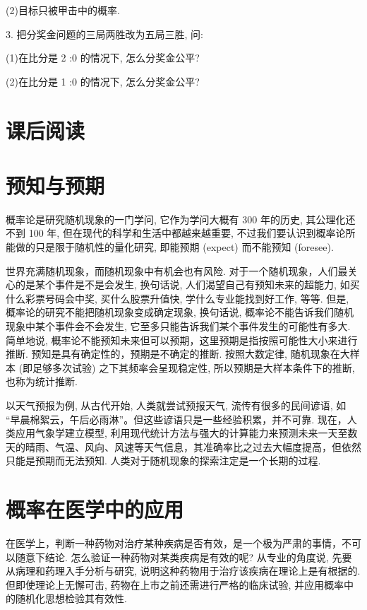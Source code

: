 \documentclass[10pt]{article}
\begin{document}
(2)目标只被甲击中的概率.

3. 把分奖金问题的三局两胜改为五局三胜, 问:

(1)在比分是 2 :0 的情况下, 怎么分奖金公平?

(2)在比分是 1 :0 的情况下, 怎么分奖金公平?

\section*{课后阅读}

\section*{预知与预期}

概率论是研究随机现象的一门学问, 它作为学问大概有 300 年的历史, 其公理化还不到 100 年, 但在现代的科学和生活中都越来越重要, 不过我们要认识到概率论所能做的只是限于随机性的量化研究, 即能预期 (expect) 而不能预知 (foresee).

世界充满随机现象，而随机现象中有机会也有风险. 对于一个随机现象，人们最关心的是某个事件是不是会发生, 换句话说, 人们渴望自己有预知未来的超能力, 如买什么彩票号码会中奖, 买什么股票升值快, 学什么专业能找到好工作, 等等. 但是, 概率论的研究不能把随机现象变成确定现象, 换句话说, 概率论不能告诉我们随机现象中某个事件会不会发生, 它至多只能告诉我们某个事件发生的可能性有多大. 简单地说, 概率论不能预知未来但可以预期，这里预期是指按照可能性大小来进行推断. 预知是具有确定性的，预期是不确定的推断. 按照大数定律, 随机现象在大样本 (即足够多次试验) 之下其频率会呈现稳定性, 所以预期是大样本条件下的推断, 也称为统计推断.

以天气预报为例, 从古代开始, 人类就尝试预报天气, 流传有很多的民间谚语, 如 “早晨棉絮云，午后必雨淋”。但这些谚语只是一些经验积累，并不可靠. 现在，人类应用气象学建立模型, 利用现代统计方法与强大的计算能力来预测未来一天至数天的晴雨、气温、风向、风速等天气信息，其准确率比之过去大幅度提高，但依然只能是预期而无法预知. 人类对于随机现象的探索注定是一个长期的过程.

\section*{概率在医学中的应用}

在医学上，判断一种药物对治疗某种疾病是否有效，是一个极为严肃的事情，不可以随意下结论. 怎么验证一种药物对某类疾病是有效的呢? 从专业的角度说, 先要从病理和药理入手分析与研究, 说明这种药物用于治疗该疾病在理论上是有根据的. 但即使理论上无懈可击, 药物在上市之前还需进行严格的临床试验, 并应用概率中的随机化思想检验其有效性.
\end{document}
